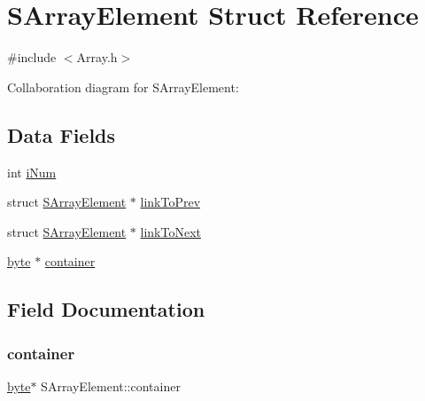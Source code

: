 \hypertarget{struct_s_array_element}{}\section{S\+Array\+Element Struct Reference}
\label{struct_s_array_element}


{\ttfamily \#include $<$Array.\+h$>$}



Collaboration diagram for S\+Array\+Element\+:
\subsection*{Data Fields}
\begin{DoxyCompactItemize}
\item 
int \hyperlink{struct_s_array_element_a59cc074b7bda92f65b97b5cb9dddec5e}{i\+Num}
\item 
struct \hyperlink{struct_s_array_element}{S\+Array\+Element} $\ast$ \hyperlink{struct_s_array_element_a3bfdbcb5a8d34670a0a67e3e91c0646f}{link\+To\+Prev}
\item 
struct \hyperlink{struct_s_array_element}{S\+Array\+Element} $\ast$ \hyperlink{struct_s_array_element_a1ca4331e530d168177a231b87f3c39af}{link\+To\+Next}
\item 
\hyperlink{_array_8h_a0c8186d9b9b7880309c27230bbb5e69d}{byte} $\ast$ \hyperlink{struct_s_array_element_a87d624c24901312ce8ade3523252f237}{container}
\end{DoxyCompactItemize}


\subsection{Field Documentation}
\mbox{\label{struct_s_array_element_a87d624c24901312ce8ade3523252f237}} 
\subsubsection{\texorpdfstring{container}{container}}
{\footnotesize\ttfamily \hyperlink{_array_8h_a0c8186d9b9b7880309c27230bbb5e69d}{byte}$\ast$ S\+Array\+Element\+::container}

\mbox{\label{struct_s_array_element_a59cc074b7bda92f65b97b5cb9dddec5e}} 
